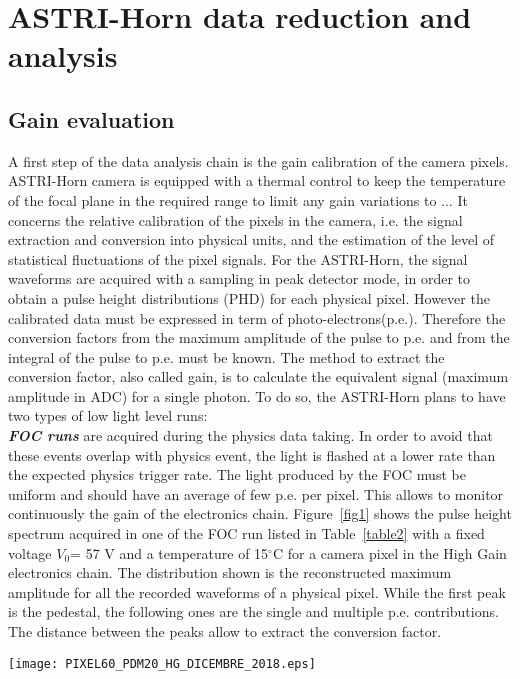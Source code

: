 \section{ASTRI-Horn data reduction and analysis} 
\label{sect:astridata}

\subsection{Gain evaluation}
\label{subs:gain}

A first step of the data analysis chain is the gain calibration of the camera pixels.
ASTRI-Horn camera is equipped with a thermal control to keep  the temperature of the focal plane in the required range to limit any gain variations to ... %
It concerns the relative calibration 
of the pixels in the camera, i.e. the signal extraction and conversion into 
physical units, and the estimation of the level of statistical 
fluctuations of the pixel signals.
For the ASTRI-Horn, the signal waveforms are acquired with a 
sampling in peak detector mode, in order to obtain a pulse height distributions (PHD) for 
each physical pixel.
However the calibrated data must be expressed in term of 
photo-electrons(p.e.). Therefore the conversion factors from the maximum 
amplitude of the pulse to p.e. and from the integral of the pulse to p.e. 
must be known. 
The method to extract the conversion factor, also called gain, is to calculate the equivalent 
signal (maximum amplitude in ADC) for a single photon.
To do so, the ASTRI-Horn plans to have two types of low light level runs:\\
\textbf{\textit{FOC runs}} are acquired during the physics data taking.
In order to avoid that these events overlap with physics event, the light is flashed 
at a lower rate than the expected physics trigger rate. The light 
produced by the FOC must be uniform and should have an average of 
few p.e. per pixel. This allows to monitor continuously the gain of the 
electronics chain. Figure~\ref{fig1} shows the pulse height spectrum acquired in one of the FOC run listed in Table~\ref{table2} with a fixed voltage $V_{0}$= 57 V 
and a temperature of 15$^\circ$C for a camera pixel in the High Gain electronics chain. 
The distribution shown is the reconstructed maximum amplitude for all the 
recorded waveforms of a physical pixel. While the first peak is the pedestal, the following 
ones are the single and multiple p.e. contributions. The distance between 
the peaks allow to extract the conversion factor.\\
\begin{figure*}[ht!!]
\centering
\texttt{[image: PIXEL60\_PDM20\_HG\_DICEMBRE\_2018.eps]}
\vspace{0.5cm}
\caption{ Pulse height spectrum at a fixed temperature of 15$^\circ$C
and $V_{0}$=57 V for a camera pixel, during a FOC run in the HG electronics chain. 
The black curve represents the distribution of the peak detector output and the red curve shows the corresponding
multiple peaks Gaussian fit.}
\label{fig1}
\end{figure*}

